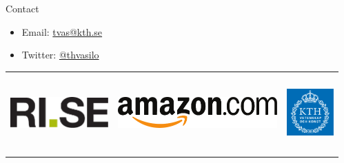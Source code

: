 \documentclass[final]{beamer}
\newlength{\sepwid}
\newlength{\onecolwid}
\begin{document}
\begin{frame}[t]
\begin{columns}[t]
\begin{column}{\onecolwid}
	\begin{alertblock}{Contact}
	
	\begin{itemize}
	\item Email: \href{mailto:tvas@kth.se}{tvas@kth.se}
	\item Twitter: \href{https://www.twitter.com/thvasilo}{@thvasilo}
	\end{itemize}
	
	\end{alertblock}
	
	\begin{center}
	\begin{tabular}{ccc}
	\includegraphics[height=2cm]{rise_logo_horizontal_cmyk.pdf} \hfill & 
	\includegraphics[height=2cm]{amazon} \hfill & \includegraphics[height=3cm]{kth}
	\end{tabular}
	\end{center}


\end{column} %

\begin{column}{\sepwid}\end{column} %

\end{columns} %

\end{frame} %
\end{document}
